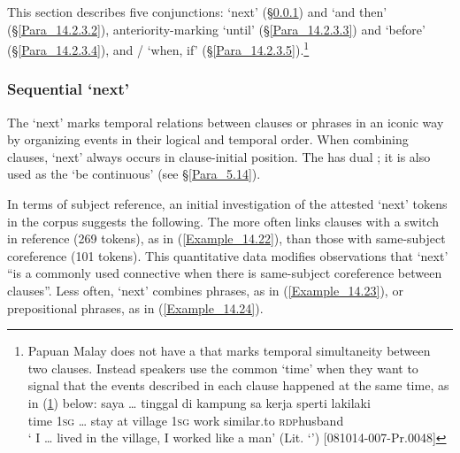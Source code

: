 This section describes five conjunctions:   ‘next’ (§\ref{Para_14.2.3.1}) and  ‘and then’ (§\ref{Para_14.2.3.2}), anteriority-marking  ‘until’ (§\ref{Para_14.2.3.3}) and  ‘before’ (§\ref{Para_14.2.3.4}), and /  ‘when, if’ (§\ref{Para_14.2.3.5}).\footnote{Papuan Malay does not have a  that marks temporal simultaneity between two clauses. Instead speakers use the common   ‘time’ when they want to signal that the events described in each clause happened at the same time, as in (\ref{Footnote_Example_14.4}) below:
\vspace{-5pt}
\ea
\label{Footnote_Example_14.4}
\gll {} {saya} {\ldots} {tinggal} {di} {kampung} {sa} {kerja} {sperti} {laki{\Tilde}laki}\\
 {time} \textsc{1sg} {\ldots} {stay} {at} {village} \textsc{1sg} {work} {similar.to} {\textsc{rdp}{\Tilde}husband}\\
\glt ‘ I {\ldots} lived in the village, I worked like a man’ (Lit. ‘’) [081014-007-Pr.0048]
\z
}
%

\subsubsection[Sequential trus ‘next’]{Sequential  ‘next’}
\label{Para_14.2.3.1}
The    ‘next’ marks temporal relations between clauses or phra\-ses in an iconic way by organizing events in their logical and temporal order. When combining clauses,  ‘next’ always occurs in clause-initial position. The  has dual ; it is also used as the    ‘be continuous’ (see §\ref{Para_5.14}).



In terms of subject reference, an initial investigation of the attested  ‘next’ tokens in the corpus suggests the following. The  more often links clauses with a switch in reference (269 tokens), as in (\ref{Example_14.22}), than those with same-subject coreference (101 tokens). This quantitative data modifies  observations that  ‘next’ “is a commonly used connective when there is same-subject coreference  between clauses”. Less often,  ‘next’ combines  phrases, as in (\ref{Example_14.23}), or prepositional phrases, as in (\ref{Example_14.24}).


